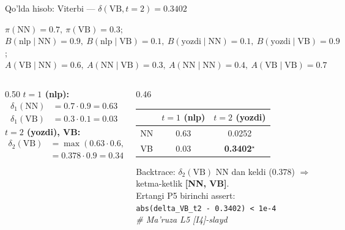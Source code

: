 \documentclass[aspectratio=169,11pt]{beamer}
\begin{document}
%
\begin{frame}{Qo'lda hisob: Viterbi --- $\delta(\text{VB},t{=}2)=0.3402$}
  \begin{tcolorbox}[defbox,title={HMM: kuzatuvlar (nlp, yozdi); holatlar (NN, VB)}]
    \scriptsize
    $\pi(\text{NN}){=}0.7,\ \pi(\text{VB}){=}0.3$;\quad
    $B(\text{nlp}{\mid}\text{NN}){=}0.9,\ B(\text{nlp}{\mid}\text{VB}){=}0.1,\
     B(\text{yozdi}{\mid}\text{NN}){=}0.1,\ B(\text{yozdi}{\mid}\text{VB}){=}0.9$;\quad
    $A(\text{VB}{\mid}\text{NN}){=}0.6,\ A(\text{NN}{\mid}\text{VB}){=}0.3,\
     A(\text{NN}{\mid}\text{NN}){=}0.4,\ A(\text{VB}{\mid}\text{VB}){=}0.7$
  \end{tcolorbox}
  \vspace{0.2em}
  \begin{columns}[T]
    \begin{column}{0.50\textwidth}
      \small\textbf{$t{=}1$ (nlp):}
      \begin{align*}
        \delta_1(\text{NN}) &= 0.7\cdot 0.9 = 0.63\\
        \delta_1(\text{VB}) &= 0.3\cdot 0.1 = 0.03
      \end{align*}
      \textbf{$t{=}2$ (yozdi), VB:}
      \begin{align*}
        \delta_2(\text{VB}) &= \max(0.63{\cdot}0.6,\; 0.03{\cdot}0.7)\cdot 0.9\\
          &= 0.378 \cdot 0.9 = \mathbf{0.3402}
      \end{align*}
    \end{column}
    \begin{column}{0.46\textwidth}
      \begin{center}\footnotesize
      \begin{tabular}{c|cc}
         & $t{=}1$ (nlp) & $t{=}2$ (yozdi) \\
        \hline
        NN & 0.63 & 0.0252 \\
        VB & 0.03 & \textbf{0.3402}$^\star$ \\
      \end{tabular}
      \end{center}
      \vspace{2pt}
      \footnotesize Backtrace: $\delta_2(\text{VB})$ NN dan keldi ($0.378$)
      $\Rightarrow$ ketma-ketlik \textbf{[NN, VB]}.\\[4pt]
      \color{halfgray}Ertangi P5 birinchi assert:\\
      \texttt{abs(delta\_VB\_t2 - 0.3402) < 1e-4}\\
      \textit{\# Ma'ruza L5 [I4]-slayd}
    \end{column}
  \end{columns}
\end{frame}
\end{document}
